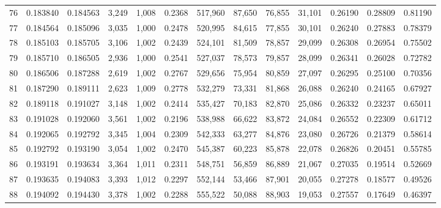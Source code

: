 \begin{tabular}{rrrrrrrrrrrrr}
76  &  0.183840 &  0.184563 &   3,249 &  1,008 &                                     0.2368 &  517,960 &   87,650 &   76,855 &   31,101 &  0.26190 &  0.28809 &  0.81190 \\
77  &  0.184564 &  0.185096 &   3,035 &  1,000 &                                     0.2478 &  520,995 &   84,615 &   77,855 &   30,101 &  0.26240 &  0.27883 &  0.78379 \\
78  &  0.185103 &  0.185705 &   3,106 &  1,002 &                                     0.2439 &  524,101 &   81,509 &   78,857 &   29,099 &  0.26308 &  0.26954 &  0.75502 \\
79  &  0.185710 &  0.186505 &   2,936 &  1,000 &                                     0.2541 &  527,037 &   78,573 &   79,857 &   28,099 &  0.26341 &  0.26028 &  0.72782 \\
80  &  0.186506 &  0.187288 &   2,619 &  1,002 &                                     0.2767 &  529,656 &   75,954 &   80,859 &   27,097 &  0.26295 &  0.25100 &  0.70356 \\
81  &  0.187290 &  0.189111 &   2,623 &  1,009 &                                     0.2778 &  532,279 &   73,331 &   81,868 &   26,088 &  0.26240 &  0.24165 &  0.67927 \\
82  &  0.189118 &  0.191027 &   3,148 &  1,002 &                                     0.2414 &  535,427 &   70,183 &   82,870 &   25,086 &  0.26332 &  0.23237 &  0.65011 \\
83  &  0.191028 &  0.192060 &   3,561 &  1,002 &                                     0.2196 &  538,988 &   66,622 &   83,872 &   24,084 &  0.26552 &  0.22309 &  0.61712 \\
84  &  0.192065 &  0.192792 &   3,345 &  1,004 &                                     0.2309 &  542,333 &   63,277 &   84,876 &   23,080 &  0.26726 &  0.21379 &  0.58614 \\
85  &  0.192792 &  0.193190 &   3,054 &  1,002 &                                     0.2470 &  545,387 &   60,223 &   85,878 &   22,078 &  0.26826 &  0.20451 &  0.55785 \\
86  &  0.193191 &  0.193634 &   3,364 &  1,011 &                                     0.2311 &  548,751 &   56,859 &   86,889 &   21,067 &  0.27035 &  0.19514 &  0.52669 \\
87  &  0.193635 &  0.194083 &   3,393 &  1,012 &                                     0.2297 &  552,144 &   53,466 &   87,901 &   20,055 &  0.27278 &  0.18577 &  0.49526 \\
88  &  0.194092 &  0.194430 &   3,378 &  1,002 &                                     0.2288 &  555,522 &   50,088 &   88,903 &   19,053 &  0.27557 &  0.17649 &  0.46397 \\

\end{tabular}

